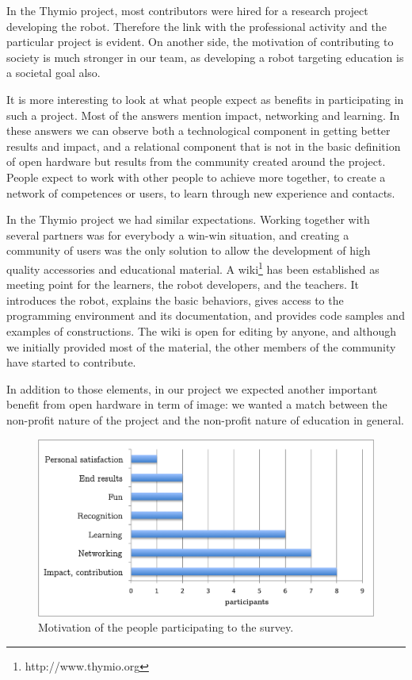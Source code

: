 \documentclass[letterpaper, 10 pt, conference]{ieeeconf}  %
\begin{document}
In the Thymio project, most contributors were hired for a research project developing the robot. 
Therefore the link with the professional activity and the particular project is evident.
On another side, the motivation of contributing to society is much stronger in our team, as developing a robot targeting education is a societal goal also.

It is more interesting to look at what people expect as benefits in participating in such a project.
Most of the answers mention impact, networking and learning. 
In these answers we can observe both a technological component in getting better results and impact, and a relational component that is not in the basic definition of open hardware but results from the community created around the project. 
People expect to work with other people to achieve more together, to create a network of competences or users, to learn through new experience and contacts. 

In the Thymio project we had similar expectations. 
Working together with several partners was for everybody a win-win situation, and creating a community of users was the only solution to allow the development of high quality accessories and educational material.
A wiki\footnote{http://www.thymio.org} has been established as meeting point for the learners, the robot developers, and the teachers.
It introduces the robot, explains the basic behaviors, gives access to the programming environment and its documentation, and provides code samples and examples of constructions.
The wiki is open for editing by anyone, and although we initially provided most of the material, the other members of the community have started to contribute.

In addition to those elements, in our project we expected another important benefit from open hardware in term of image: we wanted a match between the non-profit nature of the project and the non-profit nature of education in general. 

\begin{figure}
\centering
\includegraphics[width=.7\columnwidth]{figures/getout}
\caption{Motivation of the people participating to the survey.}
\label{fig:getout}
\end{figure}
\end{document}
